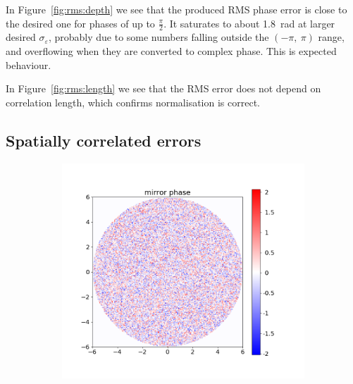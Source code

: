 \documentclass[11pt]{article}
\newcommand{\eps}{\varepsilon}
\begin{document}
In Figure~\ref{fig:rms:depth} we see that the produced RMS phase error is close to the desired one for phases of up to $\frac{\pi}{2}$. It saturates to about \SI{1.8}{\radian} at larger desired $\sigma_\eps$, probably due to some numbers falling outside the $(-\pi,\ \pi)$ range, and overflowing when they are converted to complex phase. This is expected behaviour.

In Figure~\ref{fig:rms:length} we see that the RMS error does not depend on correlation length, which confirms normalisation is correct.

\subsection{Spatially correlated errors}\label{sec:res:corr}
\begin{figure}
    \centering
    \begin{subfigure}{\textwidth}
        \begin{minipage}{0.5\textwidth}
            \includegraphics[width=\textwidth]{pictures/error_pics/errors0in_phase.png}
        \end{minipage}%
        \hfill
        \begin{minipage}{0.5\textwidth}

\end{minipage}
\end{subfigure}
\end{figure}
\end{document}
